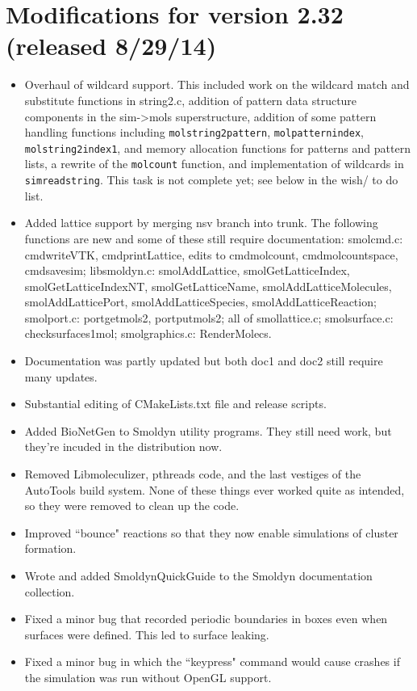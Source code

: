 \documentclass {scrbook}
\newcommand {\ttt} {\texttt}
\begin{document}
\section{Modifications for version 2.32 (released 8/29/14)}
\begin{itemize}
\item Overhaul of wildcard support. This included work on the wildcard match and substitute functions in string2.c, addition of pattern data structure components in the sim->mols superstructure, addition of some pattern handling functions including \ttt{molstring2pattern}, \ttt{molpatternindex}, \ttt{molstring2index1}, and memory allocation functions for patterns and pattern lists, a rewrite of the \ttt{molcount} function, and implementation of wildcards in \ttt{simreadstring}. This task is not complete yet; see below in the wish/ to do list.
\item Added lattice support by merging nsv branch into trunk. The following functions are new and some of these still require documentation: smolcmd.c: cmdwriteVTK, cmdprintLattice, edits to cmdmolcount, cmdmolcountspace, cmdsavesim; libsmoldyn.c: smolAddLattice, smolGetLatticeIndex, smolGetLatticeIndexNT, smolGetLatticeName, smolAddLatticeMolecules, smolAddLatticePort, smolAddLatticeSpecies, smolAddLatticeReaction; smolport.c: portgetmols2, portputmols2; all of smollattice.c; smolsurface.c: checksurfaces1mol; smolgraphics.c: RenderMolecs.
\item Documentation was partly updated but both doc1 and doc2 still require many updates.
\item Substantial editing of CMakeLists.txt file and release scripts.
\item Added BioNetGen to Smoldyn utility programs. They still need work, but they're incuded in the distribution now.
\item Removed Libmoleculizer, pthreads code, and the last vestiges of the AutoTools build system. None of these things ever worked quite as intended, so they were removed to clean up the code.
\item Improved ``bounce" reactions so that they now enable simulations of cluster formation.
\item Wrote and added SmoldynQuickGuide to the Smoldyn documentation collection.
\item Fixed a minor bug that recorded periodic boundaries in boxes even when surfaces were defined. This led to surface leaking.
\item Fixed a minor bug in which the ``keypress" command would cause crashes if the simulation was run without OpenGL support.
\end{itemize}
\end{document}
